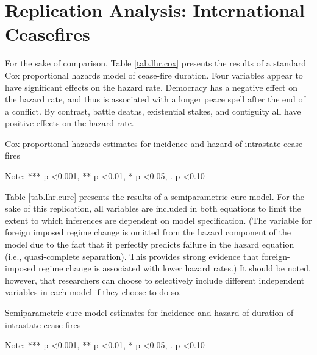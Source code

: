 
\section{Replication Analysis: International Ceasefires}

For the sake of comparison, Table \ref{tab.lhr.cox} presents the results of a standard Cox proportional hazards model of cease-fire duration. Four variables appear to have significant effects on the hazard rate. Democracy has a negative effect on the hazard rate, and thus is associated with a longer peace spell after the end of a conflict. By contrast, battle deaths, existential stakes, and contiguity all have positive effects on the hazard rate.

\begin{table}
	\caption{Cox proportional hazards estimates for incidence and hazard of intrastate cease-fires} 
	\label{tab.lhr.cox}

	Note: *** p \textless 0.001, ** p \textless 0.01, * p \textless 0.05, . p \textless 0.10
\end{table}

Table \ref{tab.lhr.cure} presents the results of a semiparametric cure model. For the sake of this replication, all variables are included in both equations to limit the extent to which inferences are dependent on model specification. (The variable for foreign imposed regime change is omitted from the hazard component of the model due to the fact that it perfectly predicts failure in the hazard equation (i.e., quasi-complete separation). This provides strong evidence that foreign-imposed regime change is associated with lower hazard rates.) It should be noted, however, that researchers can choose to selectively include different independent variables in each model if they choose to do so. 

\begin{table}
	\caption{Semiparametric cure model estimates for incidence and hazard of duration of intrastate cease-fires} 
	\label{tab.lhr.cure}

	Note: *** p \textless 0.001, ** p \textless 0.01, * p \textless 0.05, . p \textless 0.10
\end{table}

